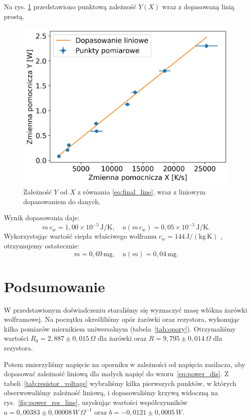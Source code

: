 \documentclass[12pt]{article}
\begin{document}
Na rys. \ref{fig:final_graph} przedstawiono punktową zależność $Y(X)$ wraz z dopasowaną linią prostą.
\begin{figure}[H]
    \centering
    \includegraphics[scale=0.7]{final_graph}
    \caption{Zależność $Y$ od $X$ z równania \eqref{eq:final_line}, wraz z liniowym dopasowaniem do danych.}
    \label{fig:final_graph}
\end{figure}
Wynik dopasowania daje:
\[
    m\,c_w = 1{,}00 \times 10^{-5}\,\mathrm{J/K}, 
    \quad
    u(m\,c_w) = 0{,}05\times 10^{-5}\,\mathrm{J/K}.
\]
Wykorzystując wartość ciepła właściwego wolframu $c_w = 144\,\mathrm{J/(kg\,K)}$ \cite{skrypt}, otrzymujemy ostatecznie:
\[
    m =0{,}69\,\mathrm{mg},
    \quad
    u(m) = 0{,}04\,\mathrm{mg}.
\]

\newpage

\section{Podsumowanie}
W przedstawionym doświadczeniu staraliśmy się wyznaczyć masę włókna żarówki wolframowej. Na początku określiliśmy opór żarówki oraz rezystora, wykonując kilka pomiarów miernikiem uniwersalnym (tabela~\ref{tab:opory}). Otrzymaliśmy wartości $R_{0} = 2{,}887 \pm 0{,}015\,\Omega$ dla żarówki oraz $R = 9{,}795 \pm 0{,}014\,\Omega$ dla rezystora.

Potem zmierzyliśmy napięcie na oporniku w zależności od napięcia zasilacza, aby dopasować zależność liniową dla małych napięć do wzoru~\ref{eq:power_dis}. Z tabeli~\ref{tab:resistor_voltage} wybraliśmy kilka pierwszych punktów, w których obserwowaliśmy zależność liniową, i dopasowaliśmy krzywą widoczną na rys.~\ref{fig:power_res_line}, uzyskując wartości współczynników $a=0{,}00383 \pm 0{,}00008\,W\,\Omega^{-1}$ oraz $b=-0{,}0121 \pm 0{,}0005\,W$.
\end{document}
